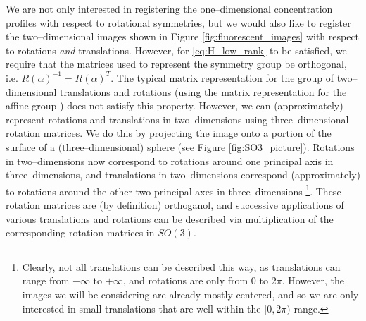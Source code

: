 \documentclass{pnastwo}
\begin{document}
\begin{article}
\begin{materials}
We are not only interested in registering the one--dimensional concentration profiles with respect to rotational symmetries, but we would also like to register the two--dimensional images shown in Figure \ref{fig:fluorescent_images} with respect to rotations {\em and} translations. 
%
However, for \eqref{eq:H_low_rank} to be satisfied, we require that the matrices used to represent the symmetry group be orthogonal, i.e. $R(\alpha)^{-1} = R(\alpha)^T$. 
%
The typical matrix representation for the group of two--dimensional translations and rotations (using the matrix representation for the affine group \cite{...}) does not satisfy this property. 
%
However, we can (approximately) represent rotations and translations in two--dimensions using three--dimensional rotation matrices.
%
We do this by projecting the image onto a portion of the surface of a (three--dimensional) sphere (see Figure \ref{fig:SO3_picture}).
%
Rotations in two--dimensions now correspond to rotations around one principal axis in three--dimensions, and translations in two--dimensions correspond (approximately) to rotations around the other two principal axes in three--dimensions \footnote{Clearly, not all translations can be described this way, as translations can range from $-\infty$ to $+ \infty$, and rotations are only from $0$ to $2 \pi$. However, the images we will be considering are already mostly centered, and so we are only interested in small translations that are well within the $[0, 2\pi)$ range.}.
%
These rotation matrices are (by definition) orthoganol, and successive applications of various translations and rotations can be described via multiplication of the corresponding rotation matrices in $SO(3)$.


\end{materials}
\end{article}
\end{document}
